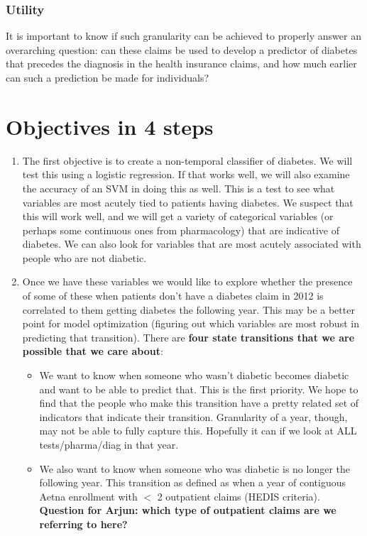 \documentclass{article}
\begin{document}
\subsubsection{Utility}

It is important to know if such granularity can be achieved to properly answer an overarching question: can these claims be used to develop a predictor of diabetes that precedes the diagnosis in the health insurance claims, and how much earlier can such a prediction be made for individuals?

\section{Objectives in 4 steps}

\begin{enumerate}
\item The first objective is to create a non-temporal classifier of diabetes. We will test this using a logistic regression. If that works well, we will also examine the accuracy of an SVM in doing this as well. This is a test to see what variables are most acutely tied to patients having diabetes. We suspect that this will work well, and we will get a variety of categorical variables (or perhaps some continuous ones from pharmacology) that are indicative of diabetes. We can also look for variables that are most acutely associated with people who are not diabetic.

\item Once we have these variables we would like to explore whether the presence of some of these when patients don't have a diabetes claim in 2012 is correlated to them getting diabetes the following year. This may be a better point for model optimization (figuring out which variables are most robust in predicting that transition).  There are \textbf{four state transitions that we are possible that we care about}: 

\begin{itemize}
\item We want to know when someone who wasn't diabetic becomes diabetic and want to be able to predict that. This is the first priority. We hope to find that the people who make this transition have a pretty related set of indicators that indicate their transition. Granularity of a year, though, may not be able to fully capture this. Hopefully it can if we look at ALL tests/pharma/diag in that year.

\item We also want to know when someone who was diabetic is no longer the following year. This transition as defined as when a year of contiguous Aetna enrollment with $<$ 2 outpatient claims (HEDIS criteria). \textbf{Question for Arjun: which type of outpatient claims are we referring to here?}


\end{itemize}
\end{enumerate}
\end{document}
